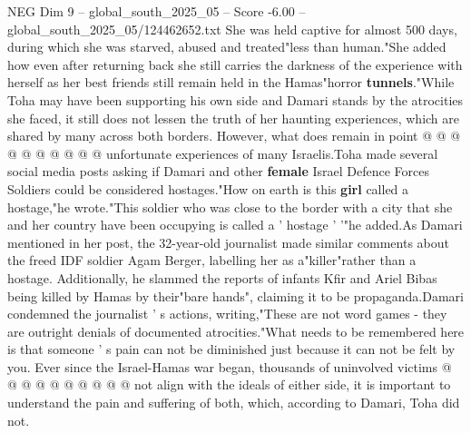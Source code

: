 \begin{textsample}{NEG Dim 9 – global\_south\_2025\_05 – Score -6.00 – global\_south\_2025\_05/124462652.txt}
She was held captive for almost 500 days, during which she was starved, abused and treated"less than human."She added how even after returning back she still carries the darkness of the experience with herself as her best friends still remain held in the Hamas"horror \textbf{tunnels}."While Toha may have been supporting his own side and Damari stands by the atrocities she faced, it still does not lessen the truth of her haunting experiences, which are shared by many across both borders.
However, what does remain in point @ @ @ @ @ @ @ @ @ @ unfortunate experiences of many Israelis.Toha made several social media posts asking if Damari and other \textbf{female} Israel Defence Forces Soldiers could be considered hostages."How on earth is this \textbf{girl} called a hostage,"he wrote."This soldier who was close to the border with a city that she and her country have been occupying is called a ' hostage ' '"he added.As Damari mentioned in her post, the 32-year-old journalist made similar comments about the freed IDF soldier Agam Berger, labelling her as a"killer"rather than a hostage.
Additionally, he slammed the reports of infants Kfir and Ariel Bibas being killed by Hamas by their"bare hands", claiming it to be propaganda.Damari condemned the journalist ' s actions, writing,"These are not word games - they are outright denials of documented atrocities."What needs to be remembered here is that someone ' s pain can not be diminished just because it can not be felt by you.
Ever since the Israel-Hamas war began, thousands of uninvolved victims @ @ @ @ @ @ @ @ @ @ not align with the ideals of either side, it is important to understand the pain and suffering of both, which, according to Damari, Toha did not.

\end{textsample}
